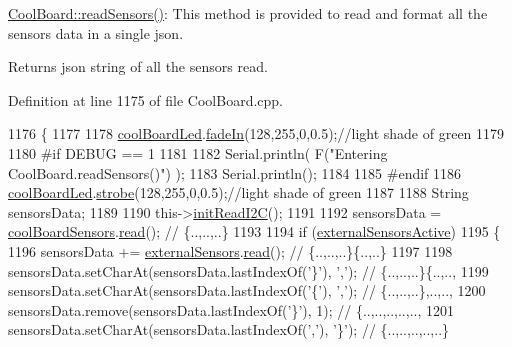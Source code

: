 \hyperlink{class_cool_board_ad03abdce2e65f520bbf2cff0f2d083cf}{Cool\+Board\+::read\+Sensors()}\+: This method is provided to read and format all the sensors data in a single json.

\begin{DoxyReturn}{Returns}
json string of all the sensors read. 
\end{DoxyReturn}


Definition at line 1175 of file Cool\+Board.\+cpp.


\begin{DoxyCode}
1176 \{
1177 
1178     \hyperlink{class_cool_board_a1b1d3c684a5baa56b08486e192fd8e97}{coolBoardLed}.\hyperlink{class_cool_board_led_ab778f5e7bed0ab74e3906d82110493c3}{fadeIn}(128,255,0,0.5);\textcolor{comment}{//light shade of green}
1179                 
1180 \textcolor{preprocessor}{#if DEBUG == 1}
1181 
1182     Serial.println( F(\textcolor{stringliteral}{"Entering CoolBoard.readSensors()"}) );
1183     Serial.println();
1184 
1185 \textcolor{preprocessor}{#endif}
1186     \hyperlink{class_cool_board_a1b1d3c684a5baa56b08486e192fd8e97}{coolBoardLed}.\hyperlink{class_cool_board_led_ad5f0de4c628cbfbf49896042831c64ad}{strobe}(128,255,0,0.5);\textcolor{comment}{//light shade of green}
1187 
1188     String sensorsData;
1189     
1190     this->\hyperlink{class_cool_board_a397b46fadab8f530a8cf4d914c561366}{initReadI2C}();
1191 
1192     sensorsData = \hyperlink{class_cool_board_af102be5288bd7f7a8e59b13f86e26a00}{coolBoardSensors}.\hyperlink{class_cool_board_sensors_a91badb2539d91fda8679f2a597874c48}{read}(); \textcolor{comment}{// \{..,..,..\}}
1193     
1194     \textcolor{keywordflow}{if} (\hyperlink{class_cool_board_a638b00b76aeb819ecfd4c10b8cdd7bb7}{externalSensorsActive})
1195     \{
1196         sensorsData += \hyperlink{class_cool_board_a09e26264839c65873eb56af476eff6b2}{externalSensors}.\hyperlink{class_external_sensors_a53177b81eca3be89508b5511ddcd00fc}{read}(); \textcolor{comment}{// \{..,..,..\}\{..,..\}}
1197 
1198         sensorsData.setCharAt(sensorsData.lastIndexOf(\textcolor{charliteral}{'\}'}), \textcolor{charliteral}{','}); \textcolor{comment}{// \{..,..,..\}\{..,..,}
1199         sensorsData.setCharAt(sensorsData.lastIndexOf(\textcolor{charliteral}{'\{'}), \textcolor{charliteral}{','}); \textcolor{comment}{// \{..,..,..\},..,..,}
1200         sensorsData.remove(sensorsData.lastIndexOf(\textcolor{charliteral}{'\}'}), 1); \textcolor{comment}{// \{..,..,..,..,..,}
1201         sensorsData.setCharAt(sensorsData.lastIndexOf(\textcolor{charliteral}{','}), \textcolor{charliteral}{'\}'}); \textcolor{comment}{// \{..,..,..,..,..\}}

\end{DoxyCode}

